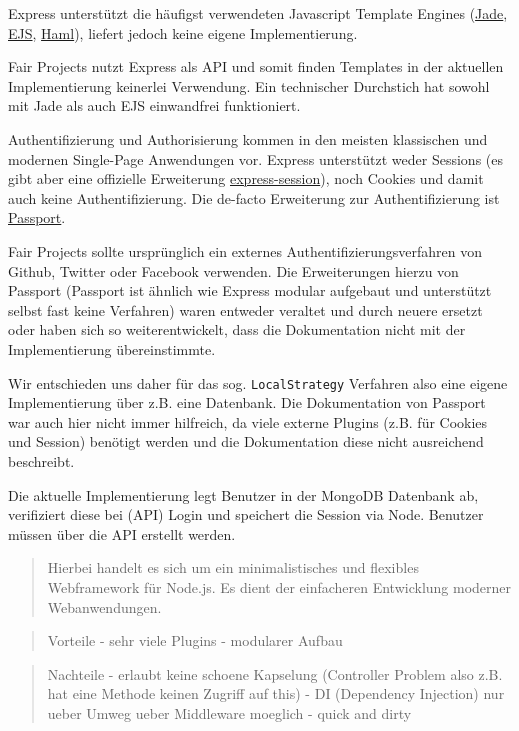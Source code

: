 Express unterstützt die häufigst verwendeten Javascript Template Engines
(\href{http://github.com/visionmedia/jade}{Jade},
\href{http://github.com/visionmedia/ejs}{EJS},
\href{http://github.com/visionmedia/haml.js}{Haml}), liefert jedoch
keine eigene Implementierung.

Fair Projects nutzt Express als API und somit finden Templates in der
aktuellen Implementierung keinerlei Verwendung. Ein technischer
Durchstich hat sowohl mit Jade als auch EJS einwandfrei funktioniert.

Authentifizierung und Authorisierung kommen in den meisten klassischen
und modernen Single-Page Anwendungen vor. Express unterstützt weder
Sessions (es gibt aber eine offizielle Erweiterung
\href{https://github.com/expressjs/session}{express-session}), noch
Cookies und damit auch keine Authentifizierung. Die de-facto Erweiterung
zur Authentifizierung ist \href{http://passportjs.org/}{Passport}.

Fair Projects sollte ursprünglich ein externes
Authentifizierungsverfahren von Github, Twitter oder Facebook verwenden.
Die Erweiterungen hierzu von Passport (Passport ist ähnlich wie Express
modular aufgebaut und unterstützt selbst fast keine Verfahren) waren
entweder veraltet und durch neuere ersetzt oder haben sich so
weiterentwickelt, dass die Dokumentation nicht mit der Implementierung
übereinstimmte.

Wir entschieden uns daher für das sog. \texttt{LocalStrategy} Verfahren
also eine eigene Implementierung über z.B. eine Datenbank. Die
Dokumentation von Passport war auch hier nicht immer hilfreich, da viele
externe Plugins (z.B. für Cookies und Session) benötigt werden und die
Dokumentation diese nicht ausreichend beschreibt.

Die aktuelle Implementierung legt Benutzer in der MongoDB Datenbank ab,
verifiziert diese bei (API) Login und speichert die Session via Node.
Benutzer müssen über die API erstellt werden.

\begin{quote}
Hierbei handelt es sich um ein minimalistisches und flexibles
Webframework für Node.js. Es dient der einfacheren Entwicklung moderner
Webanwendungen.
\end{quote}

\begin{quote}
Vorteile - sehr viele Plugins - modularer Aufbau
\end{quote}

\begin{quote}
Nachteile - erlaubt keine schoene Kapselung (Controller Problem also
z.B. hat eine Methode keinen Zugriff auf this) - DI (Dependency
Injection) nur ueber Umweg ueber Middleware moeglich - quick and dirty
\end{quote}

